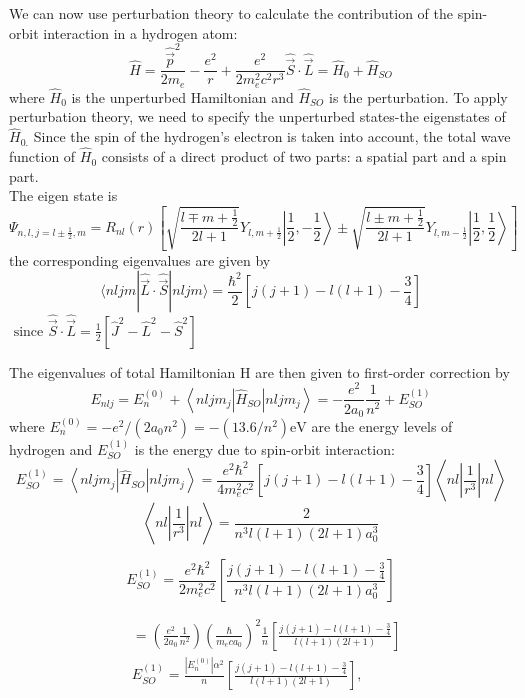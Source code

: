 We can now use perturbation theory to calculate the contribution of the spin-orbit interaction in a hydrogen atom:
$$
\hat{H}=\frac{\hat{\vec{p}}^{2}}{2 m_{e}}-\frac{e^{2}}{r}+\frac{e^{2}}{2 m_{e}^{2} c^{2} r^{3}} \hat{\vec{S}} \cdot \hat{\vec{L}}=\hat{H}_{0}+\hat{H}_{S O}
$$
where $\hat{H}_{0}$ is the unperturbed Hamiltonian and $\hat{H}_{S O}$ is the perturbation. To apply perturbation theory, we need to specify the unperturbed states-the eigenstates of $\hat{H}_{0 .}$ Since the spin of the hydrogen's electron is taken into account, the total wave function of $\hat{H}_{0}$ consists of a direct product of two parts: a spatial part and a spin part. \\
The eigen state is 
$$\Psi_{n, l, j=l \pm \frac{1}{2}, m}=R_{n l}(r)\left[\sqrt{\frac{l \mp m+\frac{1}{2}}{2 l+1}} Y_{l, m+\frac{1}{2}}\left|\frac{1}{2},-\frac{1}{2}\right\rangle \pm \sqrt{\frac{l \pm m+\frac{1}{2}}{2 l+1}} Y_{l, m-\frac{1}{2}}\left|\frac{1}{2}, \frac{1}{2}\right\rangle\right]$$
 the corresponding eigenvalues are given by
 $$\langle n l j m|\hat{\vec{L}} \cdot \hat{\vec{S}}| n l j m\rangle=\frac{\hbar^{2}}{2}\left[j(j+1)-l(l+1)-\frac{3}{4}\right]$$
$\text { since } \hat{\vec{S}} \cdot \hat{\vec{L}}=\frac{1}{2}\left[\hat{J}^{2}-\hat{L}^{2}-\hat{S}^{2}\right]$

The eigenvalues of total Hamiltonian H are then given to first-order correction by
$$
E_{n l j}=E_{n}^{(0)}+\left\langle n l j m_{j}\left|\hat{H}_{S O}\right| n l j m_{j}\right\rangle=-\frac{e^{2}}{2 a_{0}} \frac{1}{n^{2}}+E_{S O}^{(1)}
$$
where $E_{n}^{(0)}=-e^{2} /\left(2 a_{0} n^{2}\right)=-\left(13.6 / n^{2}\right) \mathrm{eV}$ are the energy levels of hydrogen and $E_{S O}^{(1)}$ is the energy due to spin-orbit interaction:
$$
E_{S O}^{(1)}=\left\langle n l j m_{j}\left|\hat{H}_{S O}\right| n l j m_{j}\right\rangle=\frac{e^{2} \hbar^{2}}{4 m_{e}^{2} c^{2}}\left[j(j+1)-l(l+1)-\frac{3}{4}\right]\left\langle n l\left|\frac{1}{r^{3}}\right| n l\right\rangle
$$
$$\left\langle n l\left|\frac{1}{r^{3}}\right| n l\right\rangle=\frac{2}{n^{3} l(l+1)(2 l+1) a_{0}^{3}}$$

$$E_{S O}^{(1)}=\frac{e^{2} \hbar^{2}}{2 m_{e}^{2} c^{2}}\left[\frac{j(j+1)-l(l+1)-\frac{3}{4}}{n^{3} l(l+1)(2 l+1) a_{0}^{3}}\right]$$

$$\begin{aligned}
	&=\left(\frac{e^{2}}{2 a_{0}} \frac{1}{n^{2}}\right)\left(\frac{\hbar}{m_{e} c a_{0}}\right)^{2} \frac{1}{n}\left[\frac{j(j+1)-l(l+1)-\frac{3}{4}}{l(l+1)(2 l+1)}\right] \\
	&E_{S O}^{(1)}=\frac{\left|E_{n}^{(0)}\right| \alpha^{2}}{n}\left[\frac{j(j+1)-l(l+1)-\frac{3}{4}}{l(l+1)(2 l+1)}\right],
\end{aligned}$$

